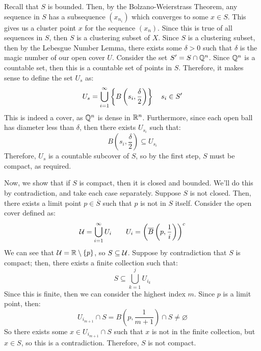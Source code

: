 \begin{pf}
    Recall that $ S $ is bounded. Then, by the Bolzano-Weierstrass Theorem,
    any sequence in $ S $ has a subsequence $ (x_{n_{i}}) $ which
    converges to some $ x \in S $. This gives us a cluster point $ x $ for the sequence $ (x_{n}) $.
    Since this is true of all sequences in $ S $, then $ S $ is a clustering subset of $ X $. \vsp
    Since $ S $ is a clustering subset, then by the Lebesgue Number Lemma, there exists some
    $ \delta > 0 $ such that $ \delta $ is the magic number of our open cover $ U $. \vsp
    Consider the set $ S' = S \cap \mathbb{Q}^{n} $. Since $ \mathbb{Q}^{n} $ is a countable set,
    then this is a countable set of points in $ S $.
    Therefore, it makes sense to define the set $ U_{s} $ as:
    \begin{equation*}
        U_{s} = \bigcup_{i=1}^{\infty} \left\{{B \left( s_{i}, \frac{\delta}{2} \right) }\right\} \quad
        s_{i} \in S'
    \end{equation*}
    This is indeed a cover, as $ \mathbb{Q}^{n} $ is dense in $ \mathbb{R}^{n} $.
    Furthermore, since each open ball has diameter less than $ \delta $,
    then there exists $ U_{s_{i}} $ such that:
    \begin{equation*}
        B \left( s_{i}, \frac{\delta}{2} \right) \subseteq U_{s_{i}}
    \end{equation*}
    Therefore, $ U_{s} $ is a countable subcover of $ S $, so by the first step,
    $ S $ must be compact, as required. \npgh

    Now, we show that if $ S $ is compact, then it is closed and bounded.
    We'll do this by contradiction, and take each case separately. \vsp
    Suppose $ S $ is not closed. Then, there exists a limit point $ p \in \overline{S} $ such that
    $ p $ is not in $ S $ itself. \vsp
    Consider the open cover defined as:
    \begin{equation*}
        \mathcal{U} = \bigcup_{i=1}^{\infty} U_{i} \qquad
        U_{i} = \left(\overline{B} \left( p, \frac{1}{i} \right) \right)^{c}
    \end{equation*}
    We can see that $ \mathcal{U} = \mathbb{R} \setminus \left\{{p}\right\} $, so $ S \subseteq \mathcal{U} $.
    Suppose by contradiction that $ S $ is compact; then, there exists a finite collection
    such that:
    \begin{equation*}
        S \subseteq \bigcup_{k = 1}^{j} U_{i_{k}}
    \end{equation*}
    Since this is finite, then we can consider the highest index $ m $.
    Since $ p $ is a limit point, then:
    \begin{equation*}
        U_{i_{m+1}} \cap S = B \left( p, \frac{1}{m+1} \right) \cap S \neq \varnothing
    \end{equation*}
    So there exists some $ x \in U_{i_{m+1}} \cap S $ such that $ x $ is not in the finite
    collection, but $ x \in S $, so this is a contradiction. Therefore, $ S $ is not compact. \npgh


\end{pf}

